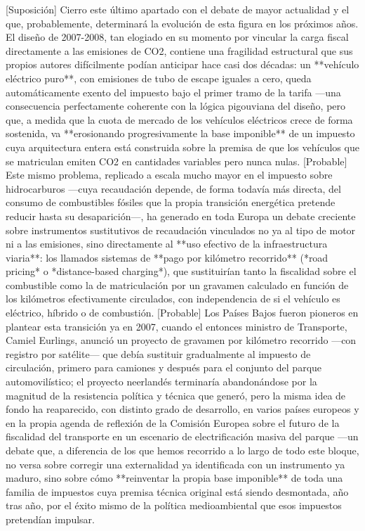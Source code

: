 \documentclass[10pt,a4paper]{article}
\begin{document}
[Suposición] Cierro este último apartado con el debate de mayor actualidad y el que, probablemente, determinará la evolución de esta figura en los próximos años. El diseño de 2007-2008, tan elogiado en su momento por vincular la carga fiscal directamente a las emisiones de CO2, contiene una fragilidad estructural que sus propios autores difícilmente podían anticipar hace casi dos décadas: un **vehículo eléctrico puro**, con emisiones de tubo de escape iguales a cero, queda automáticamente exento del impuesto bajo el primer tramo de la tarifa —una consecuencia perfectamente coherente con la lógica pigouviana del diseño, pero que, a medida que la cuota de mercado de los vehículos eléctricos crece de forma sostenida, va **erosionando progresivamente la base imponible** de un impuesto cuya arquitectura entera está construida sobre la premisa de que los vehículos que se matriculan emiten CO2 en cantidades variables pero nunca nulas. [Probable] Este mismo problema, replicado a escala mucho mayor en el impuesto sobre hidrocarburos —cuya recaudación depende, de forma todavía más directa, del consumo de combustibles fósiles que la propia transición energética pretende reducir hasta su desaparición—, ha generado en toda Europa un debate creciente sobre instrumentos sustitutivos de recaudación vinculados no ya al tipo de motor ni a las emisiones, sino directamente al **uso efectivo de la infraestructura viaria**: los llamados sistemas de **pago por kilómetro recorrido** (*road pricing* o *distance-based charging*), que sustituirían tanto la fiscalidad sobre el combustible como la de matriculación por un gravamen calculado en función de los kilómetros efectivamente circulados, con independencia de si el vehículo es eléctrico, híbrido o de combustión. [Probable] Los Países Bajos fueron pioneros en plantear esta transición ya en 2007, cuando el entonces ministro de Transporte, Camiel Eurlings, anunció un proyecto de gravamen por kilómetro recorrido —con registro por satélite— que debía sustituir gradualmente al impuesto de circulación, primero para camiones y después para el conjunto del parque automovilístico; el proyecto neerlandés terminaría abandonándose por la magnitud de la resistencia política y técnica que generó, pero la misma idea de fondo ha reaparecido, con distinto grado de desarrollo, en varios países europeos y en la propia agenda de reflexión de la Comisión Europea sobre el futuro de la fiscalidad del transporte en un escenario de electrificación masiva del parque —un debate que, a diferencia de los que hemos recorrido a lo largo de todo este bloque, no versa sobre corregir una externalidad ya identificada con un instrumento ya maduro, sino sobre cómo **reinventar la propia base imponible** de toda una familia de impuestos cuya premisa técnica original está siendo desmontada, año tras año, por el éxito mismo de la política medioambiental que esos impuestos pretendían impulsar.
\end{document}
